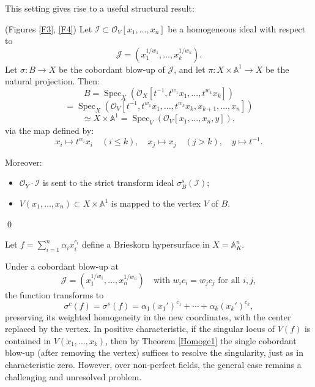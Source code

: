 \documentclass{amsart}
\renewcommand{\AA}{{\mathbb{A}}}
\newcommand{\cI}{{\mathcal I}}
\newcommand{\cJ}{{\mathcal J}}
\newcommand{\cO}{{\mathcal O}}
\newcommand{\Spec}{\operatorname{Spec}}
\newcommand{\Sing}{{\operatorname{Sing}}}
\begin{document}
This setting gives rise to a useful structural result:
\begin{lemma} \label{homo} (Figures \ref{F3}, \ref{F4})
Let $\cI \subset \cO_V[x_1, \ldots, x_n]$ be a homogeneous ideal with respect to
\[
\cJ = \left(x_1^{1/w_1}, \ldots, x_k^{1/w_k}\right).
\]
Let $\sigma: B \to X$ be the cobordant blow-up of $\cJ$, and let $\pi: X \times \mathbb{A}^1 \to X$ be the natural projection. Then:
\[
B
= \Spec_X\left(\cO_X[t^{-1}, t^{w_1} x_1, \ldots, t^{w_k} x_k]\right)
\]
\[
= \Spec_X\left(\cO_V[t^{-1}, t^{w_1} x_1, \ldots, t^{w_k} x_k, x_{k+1}, \ldots, x_n]\right)
\]
\[
\simeq X \times \mathbb{A}^1
= \Spec_V\left(\cO_V[x_1, \ldots, x_n, y]\right),
\]
via the map defined by:
\[
x_i \mapsto t^{w_i} x_i \quad (i \le k), \quad
x_j \mapsto x_j \quad (j > k), \quad
y \mapsto t^{-1}.
\]

Moreover:
\begin{itemize}
  \item $\cO_Y \cdot \cI$ is sent to the strict transform ideal $\sigma_B^s(\cI)$;
  \item $V(x_1, \ldots, x_n) \subset X \times \mathbb{A}^1$ is mapped to the vertex $V$ of $B$.
\end{itemize}
\qed
\end{lemma}
\begin{example} \label{111}
Let $f = \sum_{i=1}^n \alpha_i x_i^{c_i}$ define a Brieskorn hypersurface in $X = \AA^n_K$. 

Under a cobordant blow-up at \[
\cJ = (x_1^{1/w_1}, \ldots, x_n^{1/w_n}) \quad \text{with } w_ic_i = w_jc_j \text{ for all } i, j
,\] the function transforms to
\[
\sigma^c(f) = \sigma^s(f) = \alpha_1 (x_1')^{c_1} + \cdots + \alpha_k (x_k')^{c_k},
\]
preserving its weighted homogeneity in the new coordinates, with the center replaced by the vertex. In positive characteristic, if the singular locus of $V(f)$ is contained in \( V(x_1, \ldots, x_k) \), then by Theorem \ref{Homoge1} the single cobordant blow-up (after removing the vertex) suffices to resolve the singularity, just as in characteristic zero. However, over non-perfect fields, the general case remains a challenging and unresolved problem. \cite{CPS}
\end{example}
\end{document}
